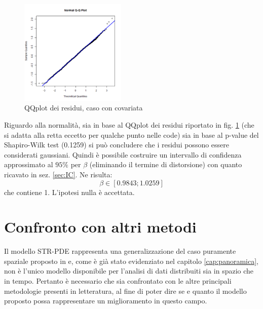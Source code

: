 \documentclass[a4paper,11pt,twoside,openright]{book}							%
\begin{document}
\begin{figure}[h]
	\centering
	\includegraphics[width=0.45\textwidth]{Immagini/DomCCovar/QQplot.png}   
   \caption{QQplot dei residui, caso con covariata}
	\label{fig:DomCcovar_qqplot}
\end{figure}
Riguardo alla normalità, sia in base al QQplot dei residui riportato in fig. \ref{fig:DomCcovar_qqplot} (che si adatta alla retta eccetto per qualche punto nelle code) sia in base al p-value del Shapiro-Wilk test (0.1259) si può concludere che i residui possono essere considerati gaussiani. Quindi è possibile costruire un intervallo di confidenza approssimato al $95\%$ per $\beta$ (eliminando il termine di distorsione) con quanto ricavato in sez. \ref{sec:IC}. Ne risulta:
$$
\beta \in [0.9843;1.0259]
$$
che contiene 1. L'ipotesi nulla è accettata.



\chapter{Confronto con altri metodi}
\label{cap:confronto}

Il modello STR-PDE rappresenta una generalizzazione del caso puramente spaziale proposto in \cite{art:sangalli} e, come è già stato evidenziato nel capitolo \ref{cap:panoramica}, non è l'unico modello disponibile per l'analisi di dati distribuiti sia in spazio che in tempo. Pertanto è necessario che sia confrontato con le altre principali metodologie presenti in letteratura, al fine di poter dire se e quanto il modello proposto possa rappresentare un miglioramento in questo campo.
\end{document}
